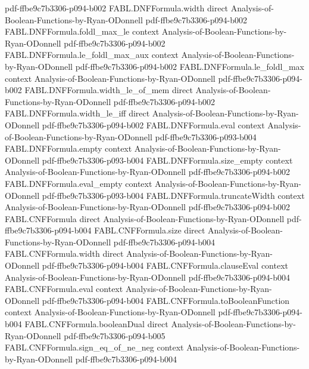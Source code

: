 \begin{theorem}
  {pdf-ffbe9c7b3306-p094-b002}
\proofstep
  {FABL.DNFFormula.width}
  {direct}
  {Analysis-of-Boolean-Functions-by-Ryan-ODonnell}
  {pdf-ffbe9c7b3306-p094-b002}
\proofstep
  {FABL.DNFFormula.foldl_max_le}
  {context}
  {Analysis-of-Boolean-Functions-by-Ryan-ODonnell}
  {pdf-ffbe9c7b3306-p094-b002}
\proofstep
  {FABL.DNFFormula.le_foldl_max_aux}
  {context}
  {Analysis-of-Boolean-Functions-by-Ryan-ODonnell}
  {pdf-ffbe9c7b3306-p094-b002}
\proofstep
  {FABL.DNFFormula.le_foldl_max}
  {context}
  {Analysis-of-Boolean-Functions-by-Ryan-ODonnell}
  {pdf-ffbe9c7b3306-p094-b002}
\proofstep
  {FABL.DNFFormula.width_le_of_mem}
  {direct}
  {Analysis-of-Boolean-Functions-by-Ryan-ODonnell}
  {pdf-ffbe9c7b3306-p094-b002}
\proofstep
  {FABL.DNFFormula.width_le_iff}
  {direct}
  {Analysis-of-Boolean-Functions-by-Ryan-ODonnell}
  {pdf-ffbe9c7b3306-p094-b002}
\proofstep
  {FABL.DNFFormula.eval}
  {context}
  {Analysis-of-Boolean-Functions-by-Ryan-ODonnell}
  {pdf-ffbe9c7b3306-p093-b004}
\proofstep
  {FABL.DNFFormula.empty}
  {context}
  {Analysis-of-Boolean-Functions-by-Ryan-ODonnell}
  {pdf-ffbe9c7b3306-p093-b004}
\proofstep
  {FABL.DNFFormula.size_empty}
  {context}
  {Analysis-of-Boolean-Functions-by-Ryan-ODonnell}
  {pdf-ffbe9c7b3306-p094-b002}
\proofstep
  {FABL.DNFFormula.eval_empty}
  {context}
  {Analysis-of-Boolean-Functions-by-Ryan-ODonnell}
  {pdf-ffbe9c7b3306-p093-b004}
\proofstep
  {FABL.DNFFormula.truncateWidth}
  {context}
  {Analysis-of-Boolean-Functions-by-Ryan-ODonnell}
  {pdf-ffbe9c7b3306-p094-b002}
\proofstep
  {FABL.CNFFormula}
  {direct}
  {Analysis-of-Boolean-Functions-by-Ryan-ODonnell}
  {pdf-ffbe9c7b3306-p094-b004}
\proofstep
  {FABL.CNFFormula.size}
  {direct}
  {Analysis-of-Boolean-Functions-by-Ryan-ODonnell}
  {pdf-ffbe9c7b3306-p094-b004}
\proofstep
  {FABL.CNFFormula.width}
  {direct}
  {Analysis-of-Boolean-Functions-by-Ryan-ODonnell}
  {pdf-ffbe9c7b3306-p094-b004}
\proofstep
  {FABL.CNFFormula.clauseEval}
  {context}
  {Analysis-of-Boolean-Functions-by-Ryan-ODonnell}
  {pdf-ffbe9c7b3306-p094-b004}
\proofstep
  {FABL.CNFFormula.eval}
  {context}
  {Analysis-of-Boolean-Functions-by-Ryan-ODonnell}
  {pdf-ffbe9c7b3306-p094-b004}
\proofstep
  {FABL.CNFFormula.toBooleanFunction}
  {context}
  {Analysis-of-Boolean-Functions-by-Ryan-ODonnell}
  {pdf-ffbe9c7b3306-p094-b004}
\proofstep
  {FABL.CNFFormula.booleanDual}
  {direct}
  {Analysis-of-Boolean-Functions-by-Ryan-ODonnell}
  {pdf-ffbe9c7b3306-p094-b005}
\proofstep
  {FABL.CNFFormula.sign_eq_of_ne_neg}
  {context}
  {Analysis-of-Boolean-Functions-by-Ryan-ODonnell}
  {pdf-ffbe9c7b3306-p094-b004}
\proofstep

\end{theorem}
